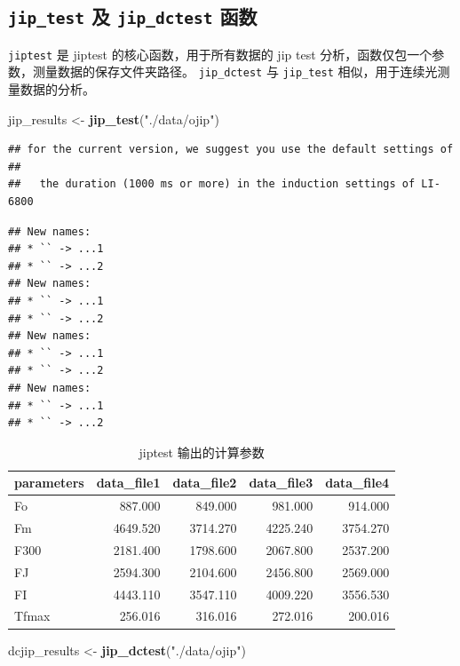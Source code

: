 \documentclass[
]{krantz}
\makeatletter
\newenvironment{Shaded}{\begin{snugshade}}{\end{snugshade}}
\newcommand{\KeywordTok}[1]{\textcolor[rgb]{0.13,0.29,0.53}{\textbf{#1}}}
\newcommand{\NormalTok}[1]{#1}
\newcommand{\StringTok}[1]{\textcolor[rgb]{0.31,0.60,0.02}{#1}}
\newenvironment{kframe}{%
\medskip{}
\setlength{\fboxsep}{.8em}
 \def\at@end@of@kframe{}%
 \ifinner\ifhmode%
  \def\at@end@of@kframe{\end{minipage}}%
  \begin{minipage}{\columnwidth}%
 \fi\fi%
 \def\FrameCommand##1{\hskip\@totalleftmargin \hskip-\fboxsep
 \colorbox{shadecolor}{##1}\hskip-\fboxsep
     \hskip-\linewidth \hskip-\@totalleftmargin \hskip\columnwidth}%
 \MakeFramed {\advance\hsize-\width
   \@totalleftmargin\z@ \linewidth\hsize
   \@setminipage}}%
 {\par\unskip\endMakeFramed%
 \at@end@of@kframe}
\renewenvironment{Shaded}{\begin{kframe}}{\end{kframe}}
\makeatother
\begin{document}
\hypertarget{testfluor}{%
\subsection{\texorpdfstring{\texttt{jip\_test} 及 \texttt{jip\_dctest} 函数}{jip\_test 及 jip\_dctest 函数}}\label{testfluor}}

\texttt{jiptest} 是 jiptest 的核心函数，用于所有数据的 jip test 分析，函数仅包一个参数，测量数据的保存文件夹路径。
\texttt{jip\_dctest} 与 \texttt{jip\_test} 相似，用于连续光测量数据的分析。

\begin{Shaded}
\begin{Highlighting}[]
\NormalTok{jip_results <-}\StringTok{ }\KeywordTok{jip_test}\NormalTok{(}\StringTok{"./data/ojip"}\NormalTok{)}
\end{Highlighting}
\end{Shaded}

\begin{verbatim}
## for the current version, we suggest you use the default settings of
## 
##   the duration (1000 ms or more) in the induction settings of LI-6800
\end{verbatim}

\begin{verbatim}
## New names:
## * `` -> ...1
## * `` -> ...2
## New names:
## * `` -> ...1
## * `` -> ...2
## New names:
## * `` -> ...1
## * `` -> ...2
## New names:
## * `` -> ...1
## * `` -> ...2
\end{verbatim}

\begin{longtable}[t]{lrrrr}
\caption{\label{tab:jipres}jiptest 输出的计算参数}\\
\toprule
parameters & data\_file1 & data\_file2 & data\_file3 & data\_file4\\
\midrule
Fo & 887.000 & 849.000 & 981.000 & 914.000\\
Fm & 4649.520 & 3714.270 & 4225.240 & 3754.270\\
F300 & 2181.400 & 1798.600 & 2067.800 & 2537.200\\
FJ & 2594.300 & 2104.600 & 2456.800 & 2569.000\\
FI & 4443.110 & 3547.110 & 4009.220 & 3556.530\\
\addlinespace
Tfmax & 256.016 & 316.016 & 272.016 & 200.016\\
\bottomrule
\end{longtable}

\begin{Shaded}
\begin{Highlighting}[]
\NormalTok{dcjip_results <-}\StringTok{ }\KeywordTok{jip_dctest}\NormalTok{(}\StringTok{"./data/ojip"}\NormalTok{)}
\end{Highlighting}
\end{Shaded}
\end{document}

